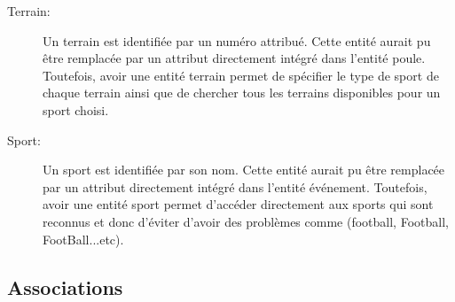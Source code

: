 \documentclass[a4paper,12pt]{report}   %
\begin{document}
\begin{description}
\item[Terrain:] Un terrain est identifiée par un numéro attribué. Cette entité aurait pu être remplacée par un attribut directement intégré dans l'entité poule. Toutefois, avoir une entité terrain permet de spécifier le type de sport de chaque terrain ainsi que de chercher tous les terrains disponibles pour un sport choisi.\\

\item[Sport:] Un sport est identifiée par son nom. Cette entité aurait pu être remplacée par un attribut directement intégré dans l'entité événement. Toutefois, avoir une entité sport permet d'accéder directement aux sports qui sont reconnus et donc d'éviter d'avoir des problèmes comme (football, Football, FootBall...etc).
\\

\end{description}


\subsection*{Associations}


\vspace{.5cm}
\end{document}
